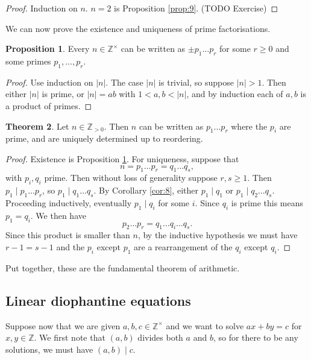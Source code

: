 \documentclass{article}
\newcommand{\Z}{\mathbb{Z}}
\newcommand{\rb}[1]{\left( #1 \right)}
\newcommand{\abs}[1]{\left\lvert #1 \right\rvert}
\theoremstyle{definition}\newtheorem{definition}{Definition}
\theoremstyle{definition}\newtheorem*{remark}{Remark}
\theoremstyle{definition}\newtheorem*{example}{Example}
\theoremstyle{definition}\newtheorem*{note}{Note}
\newtheorem{proposition}[definition]{Proposition}
\newtheorem{theorem}[definition]{Theorem}
\begin{document}
\begin{proof}
Induction on $ n $. $ n = 2 $ is Proposition \ref{prop:9}. (TODO Exercise)
\end{proof}

We can now prove the existence and uniqueness of prime factorisations.

\begin{proposition}
\label{prop:11}
Every $ n \in \Z^\times $ can be written as $ \pm p_1 \dots p_r $ for some $ r \ge 0 $ and some primes $ p_1, \dots, p_r $.
\end{proposition}

\begin{proof}
Use induction on $ \abs{n} $. The case $ \abs{n} $ is trivial, so suppose $ \abs{n} > 1 $. Then either $ \abs{n} $ is prime, or $ \abs{n} = ab $ with $ 1 < a, b < \abs{n} $, and by induction each of $ a, b $ is a product of primes.
\end{proof}

\begin{theorem}
Let $ n \in \Z_{> 0} $. Then $ n $ can be written as $ p_1 \dots p_r $ where the $ p_i $ are prime, and are uniquely determined up to reordering.
\end{theorem}

\begin{proof}
Existence is Proposition \ref{prop:11}. For uniqueness, suppose that
$$ n = p_1 \dots p_r = q_1 \dots q_s, $$
with $ p_i, q_i $ prime. Then without loss of generality suppose $ r, s \ge 1 $. Then $ p_1 \mid p_1 \dots p_r $, so $ p_1 \mid q_1 \dots q_s $. By Corollary \ref{cor:8}, either $ p_1 \mid q_1 $ or $ p_1 \mid q_2 \dots q_s $. Proceeding inductively, eventually $ p_1 \mid q_i $ for some $ i $. Since $ q_i $ is prime this means $ p_1 = q_i $. We then have
$$ p_2 \dots p_r = q_1 \dots q_i \dots q_s. $$
Since this product is smaller than $ n $, by the inductive hypothesis we must have $ r - 1 = s - 1 $ and the $ p_i $ except $ p_1 $ are a rearrangement of the $ q_i $ except $ q_i $.
\end{proof}

Put together, these are the fundamental theorem of arithmetic.

\subsection{Linear diophantine equations}

Suppose now that we are given $ a, b, c \in \Z^\times $ and we want to solve $ ax + by = c $ for $ x, y \in \Z $. We first note that $ \rb{a, b} $ divides both $ a $ and $ b $, so for there to be any solutions, we must have $ \rb{a, b} \mid c $.
\end{document}
